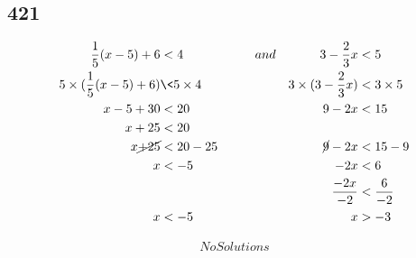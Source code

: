 \documentclass{article}
\begin{document}
    \subsection*{421}
    \begin{align*}
        \frac{1}{5}(x - 5) + 6 &< 4\hspace{2cm} and &3 - \frac{2}{3}x &< 5 \\
        5 \times (\frac{1}{5}(x - 5) + 6) &\< 5 \times 4 &3 \times (3 - \frac{2}{3}x) &< 3 \times 5  \\
        x - 5 + 30 &< 20 &9 - 2x &< 15  \\
        x  + 25 &< 20   \\
        x  \cancel{+ 25} &< 20 - 25 &\cancel{9} - 2x &< 15 - 9  \\
        x  &< -5 & - 2x &< 6  \\
        && \frac{-2x}{-2} &< \frac{6}{-2}\\
        x  &< -5  &x &>-3 \\
    \end{align*}
    \begin{align*}
        \boxed{No Solutions}
    \end{align*}
\end{document}
